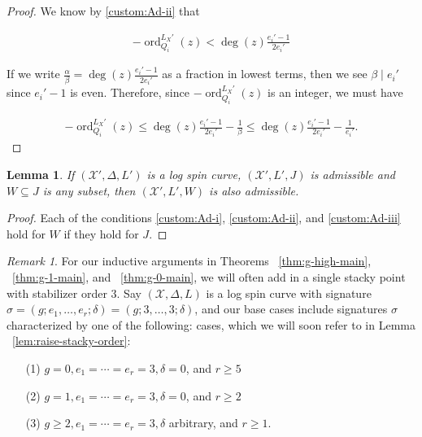 \documentclass{amsart}
\makeatletter
\theoremstyle{plain}
\newtheorem{lem}[thm]{Lemma}
\theoremstyle{definition}
\theoremstyle{remark}
\newtheorem{rem}[thm]{Remark}
\numberwithin{equation}{section}
\DeclareMathOperator{\ord}{ord}
\newcommand\sx{\mathscr X}
\newcommand \subhalf[1]{\frac{{#1} - 1}{2{#1}}}
\newcommand{\halfcan}{L}
\newcommand{\customlabel}[2]{%
   \protected@write \@auxout {}{\string \newlabel {#1}{{#2}{\thepage}{#2}{#1}{}} }%
   \hypertarget{#1}{#2}
}
\makeatother
\begin{document}
\begin{proof}
We know by \ref{custom:Ad-ii} that

\begin{align*}
	-\ord_{Q_i}
^{\halfcan_X'}(z) < \deg(z) \subhalf{e_i'}
\end{align*}

\noindent
If we write $\frac{\alpha}{\beta} = \deg(z) \frac{e_i'- 1}{2e_i'}$ 
as a fraction in lowest terms, then we see $\beta \mid e_i'$ since $
e_i'- 1$ is even. Therefore, since $-\ord_{Q_i}
^{\halfcan_X'}(z)$ is an integer, 
we must have

\begin{align*}
	-\ord_{Q_i}
^{\halfcan_X'}(z) \leq \deg(z) \subhalf{e_i'} - \frac{1}{\beta} \leq 
	\deg(z) \subhalf{e_i'} - \frac{1}{e_i'}.
\end{align*}
\end{proof}

\begin{lem}
\label{lem:admissible_subset}
If $(\sx', \Delta, \halfcan')$ is a log spin curve, $(\sx', \halfcan', J)$ is admissible and $W \subseteq J$ is any subset,
then $(\sx', L', W)$ is also admissible.
\end{lem}

\begin{proof}
Each of the conditions \ref{custom:Ad-i}, \ref{custom:Ad-ii}, and \ref{custom:Ad-iii} hold for $W$
if they hold for $J$.
\end{proof}

\begin{rem}
\label{rem:three-cases}
For our inductive arguments in Theorems ~\ref{thm:g-high-main},
~\ref{thm:g-1-main}, and ~\ref{thm:g-0-main}, we will often add in a
single stacky point with stabilizer order $3$. Say $(\sx, \Delta,
\halfcan)$ is a log spin curve with signature $\sigma = (g; e_1,
\ldots, e_r; \delta) = (g; 3, \ldots, 3; \delta)$, and our base cases
include signatures $\sigma$ characterized by one of the following:
cases, which we will soon refer to in Lemma
~\ref{lem:raise-stacky-order}:

\begin{enumerate}
	\item[\customlabel{custom:three-cases-1}{(1)}] $g = 0, e_1 =
		\cdots = e_r = 3, \delta = 0$, and $r \geq 5$
	\item[\customlabel{custom:three-cases-2}{(2)}] $g = 1, e_1 =
		\cdots = e_r = 3, \delta = 0$, and $ r \geq 2$
	\item[\customlabel{custom:three-cases-3}{(3)}] $g \geq 2, e_1 =
		\cdots = e_r = 3, \delta$ arbitrary, and $r \geq 1$.
\end{enumerate}
\end{rem}
\end{document}
